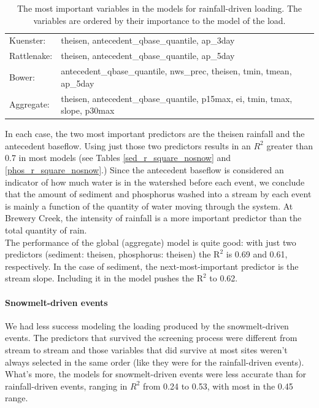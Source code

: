 \documentclass[10pt]{article}
\begin{document}
\begin{table}[h!]
\begin{center}
\begin{tabular}{ll}
        \hspace{5mm} Kuenster: & theisen, antecedent\_qbase\_quantile, ap\_3day\\
        \hspace{5mm} Rattlenake: & theisen, antecedent\_qbase\_quantile, ap\_5day\\
        \hspace{5mm} Bower: & antecedent\_qbase\_quantile, nws\_prec, theisen, tmin, tmean, ap\_5day\\
        \hspace{5mm} Aggregate: & theisen, antecedent\_qbase\_quantile, p15max, ei, tmin, tmax, slope, p30max\\
    \end{tabular}
    \caption{The most important variables in the models for rainfall-driven loading. The variables are ordered by their importance to the model of the load. \label{nosnow_predictor_list}}
    \end{center}
\end{table}

In each case, the two most important predictors are the theisen rainfall and the antecedent baseflow. Using just those two predictors results in an $R^2$ greater than 0.7 in most models (see Tables \ref{sed_r_square_nosnow} and \ref{phos_r_square_nosnow}.) Since the antecedent baseflow is considered an indicator of how much water is in the watershed before each event, we conclude that the amount of sediment and phosphorus washed into a stream by each event is mainly a function of the quantity of water moving through the system. At Brewery Creek, the intensity of rainfall is a more important predictor than the total quantity of rain.\\

The performance of the global (aggregate) model is quite good: with just two predictors (sediment: theisen, phosphorus: theisen) the $\text{R}^2$ is 0.69 and 0.61, respectively. In the case of sediment, the next-most-important predictor is the stream slope. Including it in the model pushes the $\text{R}^2$ to 0.62.\\

\paragraph{Snowmelt-driven events} We had less success modeling the loading produced by the snowmelt-driven events. The predictors that survived the screening process were different from stream to stream and those variables that did survive at most sites weren't always selected in the same order (like they were for the rainfall-driven events). What's more, the models for snowmelt-driven events were less accurate than for rainfall-driven events, ranging in $R^2$ from 0.24 to 0.53, with most in the 0.45 range.\\
\end{document}
